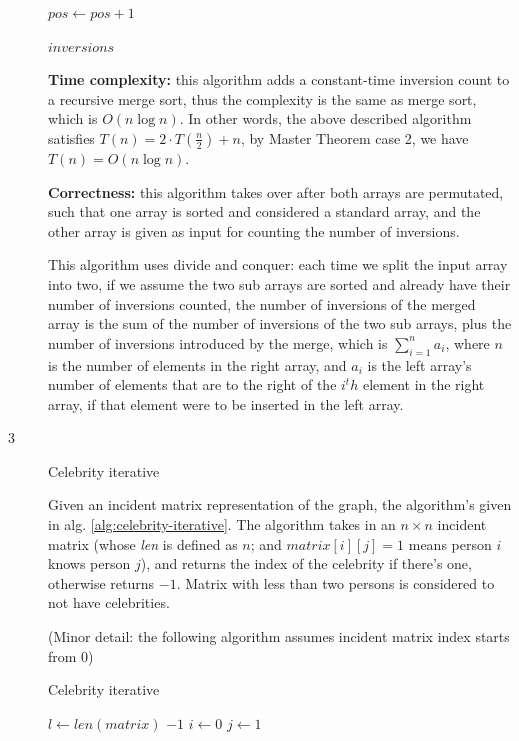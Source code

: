 \documentclass{article}
\begin{document}
\begin{description}
\begin{algorithm}[h]
\begin{algorithmic}[1]
        \State $pos \gets pos + 1$
      \EndWhile

      \State \Return $inversions$
    \EndFunction

    \end{algorithmic}
  \end{algorithm}
  
  \textbf{Time complexity:} this algorithm adds a constant-time inversion count to a recursive merge sort, thus the complexity is the same as merge sort, which is $O(n\log n)$. In other words, the above described algorithm satisfies $T(n) = 2 \cdot T(\frac{n}{2}) + n$, by Master Theorem case 2, we have $T(n) = O(n\log{n})$.

  \textbf{Correctness:} this algorithm takes over after both arrays are permutated, such that one array is sorted and considered a standard array, and the other array is given as input for counting the number of inversions. 

  This algorithm uses divide and conquer: each time we split the input array into two, if we assume the two sub arrays are sorted and already have their number of inversions counted, the number of inversions of the merged array is the sum of the number of inversions of the two sub arrays, plus the number of inversions introduced by the merge, which is $\sum_{i=1}^{n}{a_i}$, where $n$ is the number of elements in the right array, and $a_i$ is the left array's number of elements that are to the right of the $i^th$ element in the right array, if that element were to be inserted in the left array.

\item[3]{Celebrity iterative}

  Given an incident matrix representation of the graph, the algorithm's given in alg. \ref{alg:celebrity-iterative}. The algorithm takes in an $n \times n$ incident matrix (whose \textit{len} is defined as $n$; and $matrix[i][j] = 1$ means person $i$ knows person $j$), and returns the index of the celebrity if there's one, otherwise returns $-1$. Matrix with less than two persons is considered to not have celebrities.

  (Minor detail: the following algorithm assumes incident matrix index starts from 0)

  \begin{algorithm}[h]
  \caption{Celebrity iterative}
  \label{alg:celebrity-iterative}
    \begin{algorithmic}[1]
      \State $l \gets len(matrix)$
        \State \Return $-1$
      \EndIf
      \State $i \gets 0$
      \State $j \gets 1$


\end{algorithmic}
\end{algorithm}
\end{description}
\end{document}
